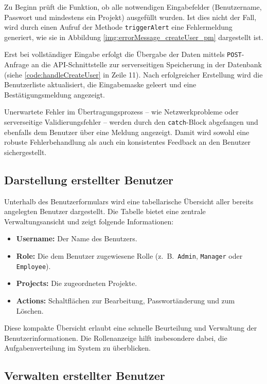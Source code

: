 Zu Beginn prüft die Funktion, ob alle notwendigen Eingabefelder (Benutzername, Passwort und mindestens ein Projekt) ausgefüllt wurden. Ist dies nicht der Fall, wird durch einen Aufruf der Methode \texttt{triggerAlert} eine Fehlermeldung generiert, wie sie in Abbildung \autoref{img:errorMessage_createUser_pm} dargestellt ist.

Erst bei vollständiger Eingabe erfolgt die Übergabe der Daten mittels \texttt{POST}-Anfrage an die API-Schnittstelle zur serverseitigen Speicherung in der Datenbank (siehe \autoref{code:handleCreateUser} in Zeile 11). Nach erfolgreicher Erstellung wird die Benutzerliste aktualisiert, die Eingabemaske geleert und eine Bestätigungsmeldung angezeigt.

Unerwartete Fehler im Übertragungsprozess – wie Netzwerkprobleme oder serverseitige Validierungsfehler – werden durch den \texttt{catch}-Block abgefangen und ebenfalls dem Benutzer über eine Meldung angezeigt. Damit wird sowohl eine robuste Fehlerbehandlung als auch ein konsistentes Feedback an den Benutzer sichergestellt.

\subsection*{Darstellung erstellter Benutzer}

Unterhalb des Benutzerformulars wird eine tabellarische Übersicht aller bereits angelegten Benutzer dargestellt. Die Tabelle bietet eine zentrale Verwaltungsansicht und zeigt folgende Informationen:

\begin{itemize}
  \item \textbf{Username:} Der Name des Benutzers.
  \item \textbf{Role:} Die dem Benutzer zugewiesene Rolle (z.\ B.\ \texttt{Admin}, \texttt{Manager} oder \texttt{Employee}).
  \item \textbf{Projects:} Die zugeordneten Projekte.
  \item \textbf{Actions:} Schaltflächen zur Bearbeitung, Passwortänderung und zum Löschen.
\end{itemize}


Diese kompakte Übersicht erlaubt eine schnelle Beurteilung und Verwaltung der Benutzerinformationen. Die Rollenanzeige hilft insbesondere dabei, die Aufgabenverteilung im System zu überblicken.

\subsection*{Verwalten erstellter Benutzer}

